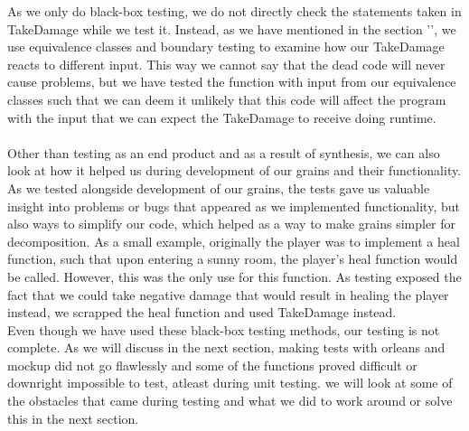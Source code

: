 As we only do black-box testing, we do not directly check the statements taken in TakeDamage while we test it. Instead, as we have mentioned in the section '', we use equivalence classes and boundary testing to examine how our TakeDamage reacts to different input. This way we cannot say that the dead code will never cause problems, but we have tested the function with input from our equivalence classes such that we can deem it unlikely that this code will affect the program with the input that we can expect the TakeDamage to receive doing runtime. \\ \\
Other than testing as an end product and as a result of synthesis, we can also look at how it helped us during development of our grains and their functionality. As we tested alongside development of our grains, the tests gave us valuable insight into problems or bugs that appeared as we implemented functionality, but also ways to simplify our code, which helped as a way to make grains simpler for decomposition. As a small example, originally the player was to implement a heal function, such that upon entering a sunny room, the player's heal function would be called. However, this was the only use for this function. As testing exposed the fact that we could take negative damage that would result in healing the player instead, we scrapped the heal function and used TakeDamage instead. \\
Even though we have used these black-box testing methods, our testing is not complete. As we will discuss in the next section, making tests with orleans and mockup did not go flawlessly and some of the functions proved difficult or downright impossible to test, atleast during unit testing. we will look at some of the obstacles that came during testing and what we did to work around or solve this in the next section. 